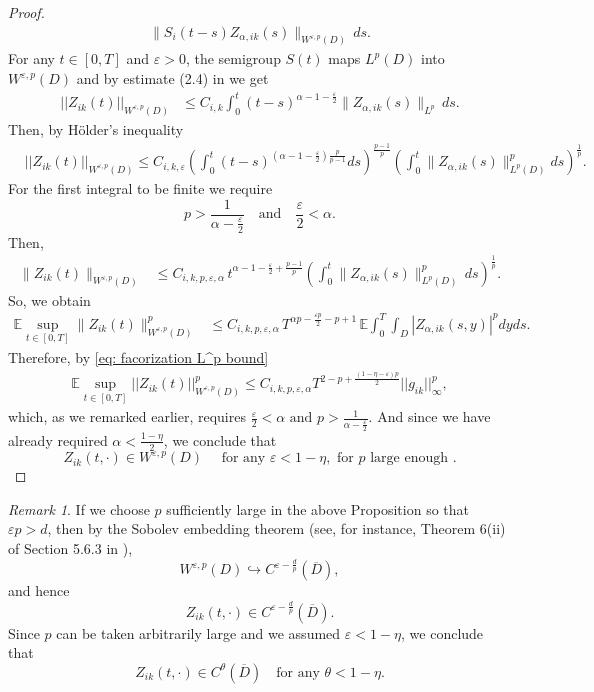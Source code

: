\documentclass[12pt]{article}
\theoremstyle{definition}
\theoremstyle{remark}
\newtheorem{remark}{Remark}
\begin{document}
\begin{proof}
\begin{align*}
\|S_i(t-s) Z_{\alpha,ik}(s)\|_{W^{\varepsilon,p}(D)}\, ds.
\end{align*}
For any $t\in [0,T]$ and $\varepsilon>0$, the semigroup $S(t)$ maps $L^p(D)$ into $W^{\varepsilon,p}(D)$ and by estimate (2.4) in \cite{cerrai2003stochastic} we get
\begin{align*}
||Z_{ik}(t)||_{W^{\varepsilon,p}(D)}&\le C_{i,k} \int_0^t (t-s)^{\alpha-1-\frac{\varepsilon}{2}}
\|Z_{\alpha,ik}(s)\|_{L^p}\, ds.
\end{align*}
Then, by H\"older's inequality
\begin{align*}
&||Z_{ik}(t)||_{W^{\varepsilon,p}(D)}\le C_{i,k,\varepsilon}
\left(
\int_0^t (t-s)^{(\alpha-1-\frac{\varepsilon}{2})\frac{p}{p-1}} ds
\right)^{\frac{p-1}{p}}
\left(
\int_0^t \|Z_{\alpha,ik}(s)\|_{L^p(D)}^pds
\right)^{\frac{1}{p}}.
\end{align*}
For the first integral to be finite we require
\[
 p > \frac{1}{\alpha - \frac{\varepsilon}{2}} \quad \text{and} \quad \frac{\varepsilon}{2} < \alpha.
\]
Then,
\begin{align*}
\|Z_{ik}(t)\|_{W^{\varepsilon,p}(D)}
&\le C_{i,k,p,\varepsilon,\alpha}\,
t^{\alpha - 1 - \frac{\varepsilon}{2} + \frac{p-1}{p}}
\left(
\int_0^t \|Z_{\alpha,ik}(s)\|_{L^p(D)}^p\, ds
\right)^{\frac{1}{p}}.
\end{align*}
So, we obtain
\begin{align*}
\mathbb{E} \sup_{t\in [0,T]} \|Z_{ik}(t)\|_{W^{\varepsilon,p}(D)}^p
&\le C_{i,k,p,\varepsilon,\alpha}\,
T^{\alpha p - \frac{\varepsilon p}{2} - p + 1}\,
\mathbb{E}
\int_0^T \int_D |Z_{\alpha,ik}(s,y)|^pdyds.
\end{align*}
Therefore, by \eqref{eq: facorization L^p bound}
\begin{align*}
\mathbb E\sup_{t\in [0,T]}||Z_{ik}(t)||_{W^{\varepsilon,p}(D)}^p \leq C_{i,k,p,\varepsilon,\alpha}T^{2-p+\frac{(1-\eta-\varepsilon)p}{2}}||g_{ik}||_{\infty}^p,
\end{align*}
which, as we remarked earlier, requires $\frac{\varepsilon}{2} < \alpha \text{ and } p>\frac{1}{\alpha - \frac{\varepsilon}{2}}$. And since we have already required $\alpha < \frac{1-\eta}{2}$, we conclude that
\[
Z_{ik}(t,\cdot) \in W^{\varepsilon,p}(D) \quad \text{ for any } \varepsilon<1-\eta, \text{ for } p \text{ large enough }.
\]
\end{proof}
\begin{remark}
If we choose $p$ sufficiently large in the above Proposition so that $\varepsilon p>d$, then by the Sobolev
embedding theorem (see, for instance, Theorem 6(ii) of Section 5.6.3 in \cite{evans2022partial}),
\[
W^{\varepsilon,p}(D)\hookrightarrow C^{\varepsilon-\frac{d}{p}}(\overline D),
\]
and hence
\[
Z_{ik}(t,\cdot)\in C^{\varepsilon-\frac{d}{p}}(\overline D).
\]
Since $p$ can be taken arbitrarily large and we assumed $\varepsilon < 1-\eta$, we conclude that
\begin{equation}\label{eq: Z(t,dot) Holder for any theta}
Z_{ik}(t,\cdot)\in C^{\theta}(\overline D)
\quad\text{for any } \theta < 1-\eta.
\end{equation}
\end{remark}
\end{document}
